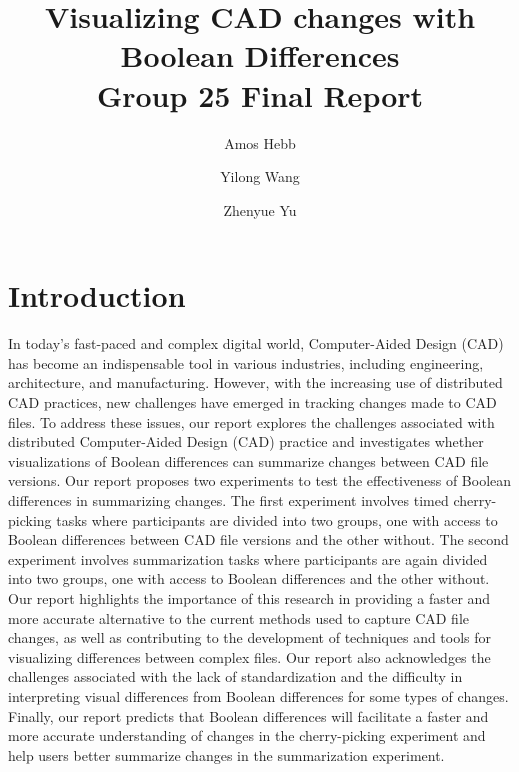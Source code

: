 \documentclass[sigconf,authorversion,nonacm]{acmart}
\begin{document}
\title[Visualizing CAD changes with Boolean Differences]
{Visualizing CAD changes with Boolean Differences\\
	\normalsize{Group 25 Final Report}}

\author{Amos Hebb}
\author{Yilong Wang}
\author{Zhenyue Yu}

\makeatletter
\def\@ACM@checkaffil{%
	\if@ACM@instpresent\else
		\ClassWarningNoLine{\@classname}{No institution present for an affiliation}%
	\fi
	\if@ACM@citypresent\else
		\ClassWarningNoLine{\@classname}{No city present for an affiliation}%
	\fi
	\if@ACM@countrypresent\else
		\ClassWarningNoLine{\@classname}{No country present for an affiliation}%
	\fi
}
\makeatother

\maketitle

\section{Introduction}

In today's fast-paced and complex digital world, Computer-Aided Design (CAD) has become an indispensable tool in various industries, including engineering, architecture, and manufacturing.
However, with the increasing use of distributed CAD practices, new challenges have emerged in tracking changes made to CAD files.
To address these issues, our report explores the challenges associated with distributed Computer-Aided Design (CAD) practice and investigates whether visualizations of Boolean differences can summarize changes between CAD file versions.
Our report proposes two experiments to test the effectiveness of Boolean differences in summarizing changes.
The first experiment involves timed cherry-picking tasks where participants are divided into two groups, one with access to Boolean differences between CAD file versions and the other without.
The second experiment involves summarization tasks where participants are again divided into two groups, one with access to Boolean differences and the other without.
Our report highlights the importance of this research in providing a faster and more accurate alternative to the current methods used to capture CAD file changes, as well as contributing to the development of techniques and tools for visualizing differences between complex files.
Our report also acknowledges the challenges associated with the lack of standardization and the difficulty in interpreting visual differences from Boolean differences for some types of changes.
Finally, our report predicts that Boolean differences will facilitate a faster and more accurate understanding of changes in the cherry-picking experiment and help users better summarize changes in the summarization experiment.
\end{document}
